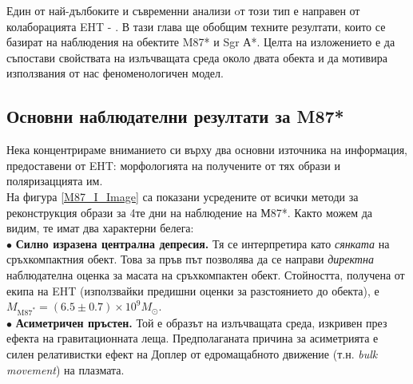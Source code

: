 Един от най-дълбоките и съвременни анализи oт този тип е направен от колаборацията EHT \cite{EHT_M87_I} - \cite{EHT_SGR_VIII}. В тази глава ще обобщим техните резултати, които се базират на наблюдения на обектите M87* и Sgr А*. Целта на изложението е да съпостави свойствата на излъчващата среда около двата обекта и да мотивира използвания от нас феноменологичен модел.
\newpage
\subsection{Основни наблюдателни резултати за M87*}

Нека концентрираме вниманието си върху два основни източника на информация, предоставени от EHT: морфологията на получените от тях образи и поляризаццията им. \\

На фигура \ref*{M87_I_Image} са показани усредените от всички методи за реконструкция образи за 4те дни на наблюдение на М87*. Както можем да видим, те имат два характерни белега:\\

$\bullet$ \textbf{Силно изразена централна депресия.} Тя се интерпретира като \emph{сянката} на сръхкомпактния обект. Това за пръв път позволява да се направи \emph{директна} наблюдателна оценка за масата на сръхкомпактен обект. Стойността, получена от екипа на EHT (използвайки предишни оценки за разстоянието до обекта), е $M_{\text{M87}^*} = (6.5\pm 0.7)\times 10^{9} M_\odot$.\\

$\bullet$ \textbf{Асиметричен пръстен.} Той е образът на излъчващата среда, изкривен през ефекта на гравитационната леща. Предполаганата причина за асиметрията е силен релативистки ефект на Доплер от едромащабното движение (т.н. \emph{bulk movement}) на плазмата.\\

